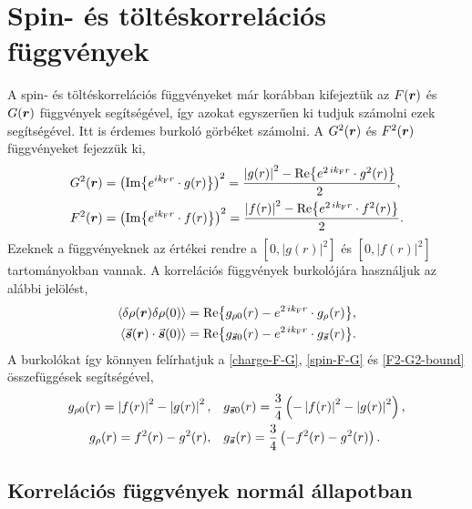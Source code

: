 \documentclass[a4paper,12pt,titlepage]{article}
\newcommand{\RR}{{\vb*{r}}}
\newcommand{\kF}{{k_\text{F}}}
\begin{document}
\section{Spin- és töltéskorrelációs függvények}

A spin- és töltéskorrelációs függvényeket már korábban kifejeztük az $F(\RR)$ és $G(\RR)$ függvények segítségével, így azokat egyszerűen ki tudjuk számolni ezek segítségével.  Itt is érdemes burkoló görbéket számolni.  A $G^2(\RR)$ és $F^2(\RR)$ függvényeket fejezzük ki,
\begin{equation} \label{F2-G2-bound}
\begin{split}
	G^2(\RR) & = \left(\Im{ e^{i \kF r} \cdot g(r) }\right)^2 = \frac{\left| g(r) \right|^2 - \Re{ e^{2 \, i \kF r} \cdot g^2(r) }}{2}, \\
	F^2(\RR) & = \left(\Im{ e^{i \kF r} \cdot f(r) }\right)^2 = \frac{\left| f(r) \right|^2 - \Re{ e^{2 \, i \kF r} \cdot f^2(r) }}{2}.
\end{split}
\end{equation}
Ezeknek a függvényeknek az értékei rendre a $\left[ 0, \left| g(r) \right|^2 \right]$ és $\left[ 0, \left| f(r) \right|^2 \right]$ tartományokban vannak.  A korrelációs függvények burkolójára használjuk az alábbi jelölést,
\begin{equation}
\begin{split}
	\expval{\delta\rho(\RR) \delta\rho(0)} & = \Re{g_{\rho 0}(r) - e^{2 \, i \kF r} \cdot g_\rho(r)}, \\
	\expval{\va*{s}(\RR) \cdot \va*{s}(0)} & = \Re{g_{\va*{s} 0}(r) - e^{2 \, i \kF r} \cdot g_{\va*{s}}(r)}.
\end{split}
\end{equation}
A burkolókat így könnyen felírhatjuk a \eqref{charge-F-G}, \eqref{spin-F-G} és \eqref{F2-G2-bound} összefüggések segítségével,
\begin{equation} \label{charge-spin-bound}
\begin{split}
	g_{\rho 0}(r) = \left| f(r) \right|^2 - \left| g(r) \right|^2, ~~~ & g_{\va*{s} 0}(r) = \frac{3}{4} \left( -\left| f(r) \right|^2 - \left| g(r) \right|^2 \right), \\
	g_\rho(r) = f^2(r) - g^2(r), ~~~ & g_{\va*{s}}(r) = \frac{3}{4} \left( -f^2(r) - g^2(r) \right).
\end{split}
\end{equation}


\subsection{Korrelációs függvények normál állapotban}
\end{document}
